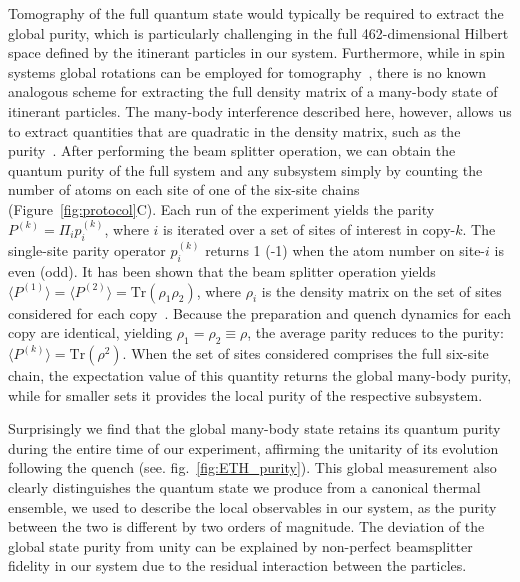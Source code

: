 Tomography of the full quantum state would typically be required to extract the global purity, which is particularly challenging in the full 462-dimensional Hilbert space defined by the itinerant particles in our system. Furthermore, while in spin systems global rotations can be employed for tomography~\cite{Sackett2000}, there is no known analogous scheme for extracting the full density matrix of a many-body state of itinerant particles. The many-body interference described here, however, allows us to extract quantities that are quadratic in the density matrix, such as the purity~\cite{Islam2015}. After performing the beam splitter operation, we can obtain the quantum purity of the full system and any subsystem simply by counting the number of atoms on each site of one of the six-site chains (Figure~\ref{fig:protocol}C). Each run of the experiment yields the parity $P^{(k)} = \Pi_i p^{(k)}_i$, where $i$ is iterated over a set of sites of interest in copy-$k$. The single-site parity operator $p^{(k)}_i$ returns 1 (-1) when the atom number on site-$i$ is even (odd). It has been shown that the beam splitter operation yields $\langle P^{(1)} \rangle = \langle P^{(2)} \rangle = \mathrm{Tr}\left (\rho_1 \rho_2  \right)$, where $\rho_i$ is the density matrix on the set of sites considered for each copy~\cite{JakschPRA, Daley2012,Islam2015}. Because the preparation and quench dynamics for each copy are identical, yielding $\rho_1 = \rho_2 \equiv \rho$, the average parity reduces to the purity: $\langle P^{(k)} \rangle = \mathrm{Tr}(\rho^2)$. When the set of sites considered comprises the full six-site chain, the expectation value of this quantity returns the global many-body purity, while for smaller sets it provides the local purity of the respective subsystem.

Surprisingly we find that the global many-body state retains its quantum purity during the entire time of our experiment, affirming the unitarity of its evolution following the quench (see. fig.~\ref{fig:ETH_purity}). This global measurement also clearly distinguishes the quantum state we produce from a canonical thermal ensemble, we used to describe the local observables in our system, as the purity between the two is different by two orders of magnitude. The deviation of the global state purity from unity can be explained by non-perfect beamsplitter fidelity in our system due to the residual interaction between the particles.

